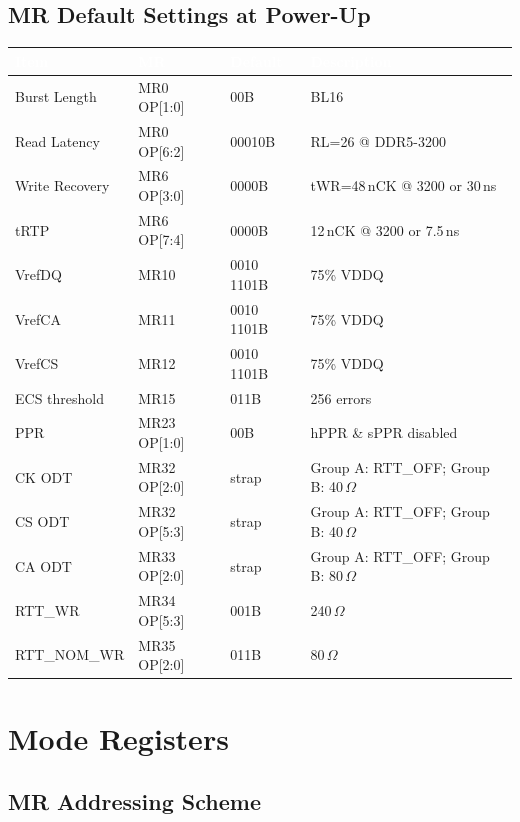 \documentclass[10pt,a4paper,twoside]{article}
\newcommand{\thd}[1]{\cellcolor{navyblue}\textcolor{white}{\textbf{#1}}}
\newcommand{\trow}{\rowcolor{lightgray}}
\newcommand{\talt}{\rowcolor{skyblue!30}}
\begin{document}
\subsection{MR Default Settings at Power-Up}

\begin{center}
\begin{tabularx}{\linewidth}{@{} l l l X @{}}
\toprule
\thd{Item} & \thd{MR} & \thd{Default} & \thd{Description} \\
\midrule
\trow Burst Length & MR0 OP[1:0] & 00B & BL16 \\
\talt Read Latency & MR0 OP[6:2] & 00010B & RL=26 @ DDR5-3200 \\
\trow Write Recovery & MR6 OP[3:0] & 0000B & tWR=48\,nCK @ 3200 or 30\,ns \\
\talt tRTP & MR6 OP[7:4] & 0000B & 12\,nCK @ 3200 or 7.5\,ns \\
\trow VrefDQ & MR10 & 0010 1101B & 75\% VDDQ \\
\talt VrefCA & MR11 & 0010 1101B & 75\% VDDQ \\
\trow VrefCS & MR12 & 0010 1101B & 75\% VDDQ \\
\talt ECS threshold & MR15 & 011B & 256 errors \\
\trow PPR & MR23 OP[1:0] & 00B & hPPR \& sPPR disabled \\
\talt CK ODT & MR32 OP[2:0] & strap & Group A: RTT\_OFF; Group B: 40\,$\Omega$ \\
\trow CS ODT & MR32 OP[5:3] & strap & Group A: RTT\_OFF; Group B: 40\,$\Omega$ \\
\talt CA ODT & MR33 OP[2:0] & strap & Group A: RTT\_OFF; Group B: 80\,$\Omega$ \\
\trow RTT\_WR & MR34 OP[5:3] & 001B & 240\,$\Omega$ \\
\talt RTT\_NOM\_WR & MR35 OP[2:0] & 011B & 80\,$\Omega$ \\
\bottomrule
\end{tabularx}
\end{center}

\section{Mode Registers}

\subsection{MR Addressing Scheme}
\end{document}
